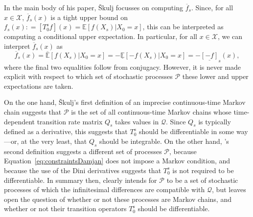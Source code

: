 \documentclass[10pt,a4paper]{paper}
\theoremstyle{definition}
\newcommand{\states}{\mathcal{X}}
\newcommand{\processes}{\mathbb{P}}
\newcommand{\wprocesses}{\processes^{\mathrm{W}}}
\newcommand{\wmprocesses}{\processes^{\mathrm{WM}}}
\newcommand{\rateset}{\mathcal{Q}}
\newcommand{\coloneqq}{:\!=}
\begin{document}
In the main body of his paper, {\v{S}kulj} focusses on computing $\overline{f}_s$. Since, for all $x\in\states$, $\overline{f}_s(x)$ is a tight upper bound on $f_s(x)\coloneqq [T_0^sf](x)=\mathbb{E}[f(X_s)\vert X_0=x]$, this can be interpreted as computing a conditional upper expectation. In particular, for all $x\in\states$, we can interpret $\overline{f}_s(x)$ as
\begin{equation*}
\overline{f}_s(x)
=
\overline{\mathbb{E}}[f(X_s)\vert X_0=x]=-\underline{\mathbb{E}}[-f(X_s)\vert X_0=x]
=-\underline{[-f]}_s(x),
\end{equation*}
where the final two equalities follow from conjugacy. 
However, it is never made explicit with respect to which set of stochastic processes $\mathcal{P}$ these lower and upper expectations are taken. 

On the one hand, {\v{S}kulj}'s first definition of an imprecise continuous-time Markov chain suggests that $\mathcal{P}$ is the set of all continuous-time Markov chains whose time-dependent transition rate matrix $Q_s$ takes values in $\rateset$. Since $Q_s$ is typically defined as a derivative, this suggests that $T_0^s$ should be differentiable in some way---or, at the very least, that $Q_s$ should be integrable. On the other hand, {}'s second definition suggests a different set of processes $\mathcal{P}$, because Equation~\eqref{eq:constraintsDamjan} does not impose a Markov condition, and because the use of the Dini derivatives suggests that $T_0^s$ is not required to be differentiable. In summary then, {} clearly intends for $\mathcal{P}$ to be a set of stochastic processes of which the infinitesimal differences are compatible with $\rateset$, but leaves open the question of whether or not these processes are Markov chains, and whether or not their transition operators $T_0^s$ should be differentiable.




\end{document}
